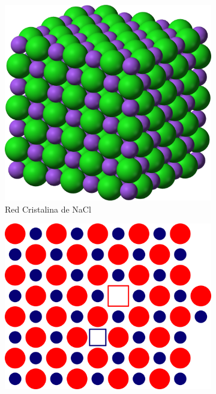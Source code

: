 \documentclass[a4paper,11pt]{article}
\begin{document}
\begin{figure}[b]
    \centering
    \begin{subfigure}[b]{0.3\textwidth}
        \includegraphics[width=\textwidth]{figs/NaCl.png}
        \caption{Red Cristalina de NaCl}
        \label{fig:nacl}
    \end{subfigure}
    \begin{subfigure}[b]{0.3\textwidth}
        \includegraphics[width=\textwidth]{figs/schottky.png}

\end{subfigure}
\end{figure}
\end{document}
